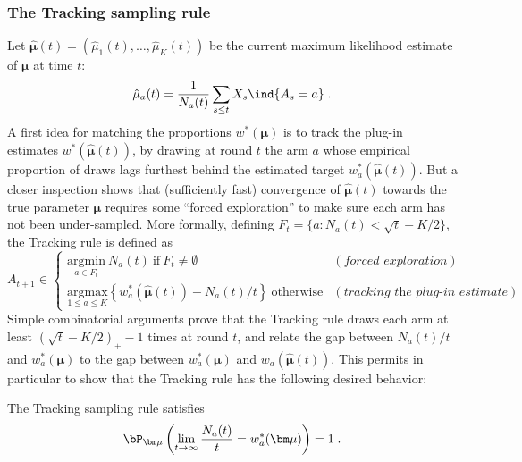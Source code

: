 \documentclass[proc]{edpsmath}
\begin{document}
	\subsubsection{The Tracking sampling rule}
	
	Let $\hat{\bm\mu}(t) = (\hat{\mu}_1(t), \dots, \hat{\mu}_K(t))$ be the current maximum likelihood estimate of $\bm\mu$ at time $t$: \[\hat{\mu}_a(t)=\frac{1}{N_a(t)}\sum_{s\leq t}X_s \ind\{A_s=a\}\;.\]
	A first idea for matching the proportions $w^*(\bm \mu)$ is to track the plug-in estimates $w^*(\hat{\bm\mu}(t))$, by drawing at round $t$ the arm $a$ whose empirical proportion of draws lags furthest behind the estimated target  $w_a^*(\hat{\bm\mu}(t))$. But a closer inspection shows that (sufficiently fast) convergence of $\hat{\bm\mu}(t)$ towards the true parameter $\bm\mu$ requires some ``forced exploration'' to make sure each arm has not been under-sampled. More formally, defining $F_t = \{a : N_a(t) < \sqrt{t} - K/2\}$, the Tracking rule is defined as 
	\[A_{t+1} \in \left\{\begin{array}{ll}
	\underset{a \in F_t}{\text{argmin}}  \ N_a(t) \ \text{if} \ F_t \neq \emptyset & (\textit{forced  exploration})\\
	\underset{1 \leq a \leq K}{\text{argmax}} \left\{w_a^*(\hat{\bm\mu}(t)) -N_a(t)/t\right\} \ \text{otherwise} & (\textit{tracking the plug-in estimate})
	\end{array}
	\right.\]
	Simple combinatorial arguments prove that the Tracking rule draws each arm at least $(\sqrt{t} -K/2)_+ -1$ times at round $t$, and relate the gap between $N_a(t)/t$ and $w_a^*(\bm\mu)$ to the gap between $w_a^*(\bm\mu)$ and $w_a(\hat{\bm\mu}(t))$. This permits in particular to show that the Tracking rule has the following desired behavior:
	
	\begin{proposition}\label{prop:ConvergenceFraction} The Tracking sampling rule satisfies
		\[\bP_{\bm\mu}\left(\lim_{t \rightarrow \infty} \frac{N_a(t)}{t} = w_a^*(\bm \mu)\right) = 1\;.\] 
	\end{proposition}
	
\end{document}
